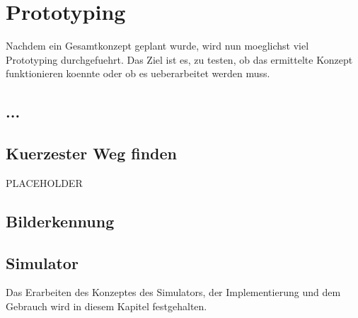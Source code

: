 \section{Prototyping}

Nachdem ein Gesamtkonzept geplant wurde, wird nun moeglichst viel Prototyping durchgefuehrt. Das Ziel ist es, zu testen, ob das ermittelte Konzept funktionieren koennte oder ob es ueberarbeitet werden muss.

\subsection{...}

\subsection{Kuerzester Weg finden}

PLACEHOLDER

\subsection{Bilderkennung}

\subsection{Simulator}

Das Erarbeiten des Konzeptes des Simulators, der Implementierung und dem Gebrauch wird in diesem Kapitel festgehalten.